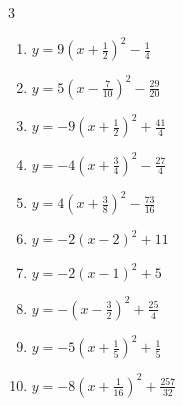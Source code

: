 \begin{multicols}{3}
\begin{enumerate}
        \phantom{$\displaystyle 頂点\left( 0 , -1 \right)$}

  \item $\displaystyle y=9\left( x+\frac{1}{2}\right)^{2}-\frac{1}{4}$


  \item $\displaystyle y=5\left( x-\frac{7}{10}\right)^{2}-\frac{29}{20}$


\columnbreak %

  \item $\displaystyle y=-9\left( x+\frac{1}{2}\right)^{2}+\frac{41}{4}$


  \item $\displaystyle y=-4\left( x+\frac{3}{4}\right)^{2}-\frac{27}{4}$


  \item $\displaystyle y=4\left( x+\frac{3}{8}\right)^{2}-\frac{73}{16}$


  \item $\displaystyle y=-2\left( x-2\right)^{2}+11$

        \phantom{$\displaystyle 頂点\left( 2 , 11 \right)$}

  \item $\displaystyle y=-2\left( x-1\right)^{2}+5$

        \phantom{$\displaystyle 頂点\left( 1 , 5 \right)$}

  \item $\displaystyle y=-\left( x-\frac{3}{2}\right)^{2}+\frac{25}{4}$


  \item $\displaystyle y=-5\left( x+\frac{1}{5}\right)^{2}+\frac{1}{5}$


  \item $\displaystyle y=-8\left( x+\frac{1}{16}\right)^{2}+\frac{257}{32}$


\end{enumerate}
\end{multicols}
